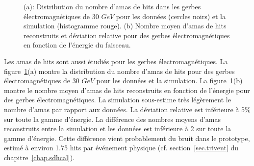 \begin{figure}[!ht]
  \caption{(a): Distribution du nombre d'amas de hits dans les gerbes électromagnétiques de 30 $GeV$ pour les données (cercles noirs) et la simulation (histogramme rouge). (b) Nombre moyen d'amas de hits reconstruits et déviation relative pour des gerbes électromagnétiques en fonction de l'énergie du faisceau.}
  \label{fig.cluster_e-}
\end{figure}
Les amas de hits sont aussi étudiés pour les gerbes électromagnétiques. La figure~\ref{fig.cluster_e-}(a) montre la distribution du nombre d'amas de hits pour des gerbes électromagnétiques de 30 $GeV$ pour les données et la simulation. La figure~\ref{fig.cluster_e-}(b) montre le nombre moyen d'amas de hits reconstruits en fonction de l'énergie pour des gerbes électromagnétiques. La simulation sous-estime très légèrement le nombre d'amas par rapport aux données. La déviation relative est inférieure à 5$\%$ sur toute la gamme d'énergie. La différence des nombres moyens d'amas reconstruits entre la simulation et les données est inférieure à 2 sur toute la gamme d'énergie. Cette différence vient probablement du bruit dans le prototype, estimé à environ 1.75 hits par événement physique (cf. section~\ref{sec.trivent} du chapitre~\ref{chap.sdhcal}). %

